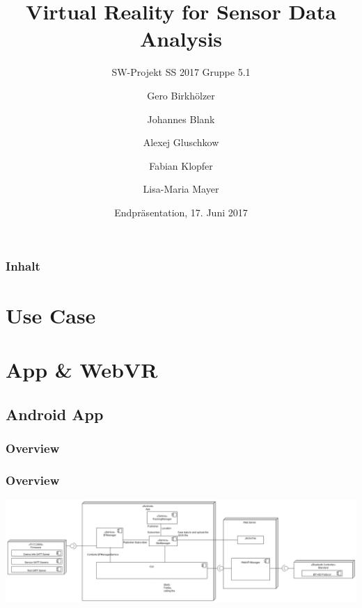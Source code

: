 \documentclass{beamer}
\title{Virtual Reality for Sensor Data Analysis}
\subtitle{SW-Projekt SS 2017 Gruppe 5.1}
\author{Gero Birkh\"olzer \and Johannes Blank \and Alexej Gluschkow \\ \and Fabian Klopfer \and Lisa-Maria Mayer}
\date{Endpr\"asentation, 17. Juni 2017}
\begin{document}
\frame{\titlepage}



\begin{frame}
  \frametitle{Inhalt}
  \tableofcontents%
\end{frame}


\section{Use Case}








\section{App \& WebVR}

\subsection{Android App}

\subsubsection{Overview}
\begin{frame} %
\frametitle{Overview}
\includegraphics[width=\textwidth]{../doc/SDD/pics/composite_app.png}
\end{frame}
\end{document}
